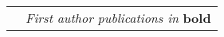 \documentclass[10pt]{article} %
\begin{document}
\begin{paracol}{2}
\begin{supertabular}{rl}
	
	
	& \textit{First author publications in} \textbf{bold}\\
	
	
\end{supertabular}

\medskip %


\end{paracol}

\end{document}
